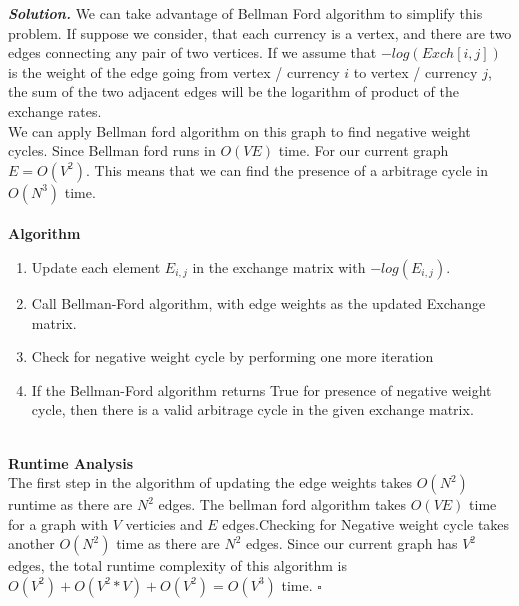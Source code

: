 \documentclass[12pt]{article}
\newenvironment{solution}[1][\it{Solution}]{\textbf{#1. } }{$\square$}
\begin{document}
\begin{solution}
	We can take advantage of Bellman Ford algorithm to simplify this problem. If suppose we consider, that each currency is a vertex, and there are two edges connecting any pair of two vertices. If we assume that $-log(Exch[i,j])$ is the weight of the edge going from vertex / currency $i$ to vertex / currency $j$, the sum of the two adjacent edges will be the logarithm of product of the exchange rates.
 \\ \indent We can apply Bellman ford algorithm on this graph to find negative weight cycles. Since Bellman ford runs in $O(VE)$ time. For our current graph $E = O(V^2)$. This means that we can find the presence of a arbitrage cycle in $O(N^3)$ time. 
 \\ \\ \textbf{Algorithm} \\
 \begin{enumerate}
     \item Update each element $E_{i,j}$ in the exchange matrix with $-log(E_{i,j})$. 
     \item Call Bellman-Ford algorithm, with edge weights as the updated Exchange matrix. 
     \item Check for negative weight cycle by performing one more iteration
     \item If the Bellman-Ford algorithm returns True for presence of negative weight cycle, then there is a valid arbitrage cycle in the given exchange matrix. 
 \end{enumerate}
 \\ \textbf{Runtime Analysis} \\ 
 \indent The first step in the algorithm of updating the edge weights takes $O(N^2)$ runtime as there are $N^2$ edges. The bellman ford algorithm takes $O(VE)$ time for a graph with $V$ verticies and $E$ edges.Checking for Negative weight cycle takes another $O(N^2)$ time as there are $N^2$ edges. Since our current graph has $V^2$ edges, the total runtime complexity of this algorithm is $O(V^2)+O(V^2*V)+O(V^2) = O(V^3)$ time.  
\end{solution} 

\hrulefill %
\end{document}
